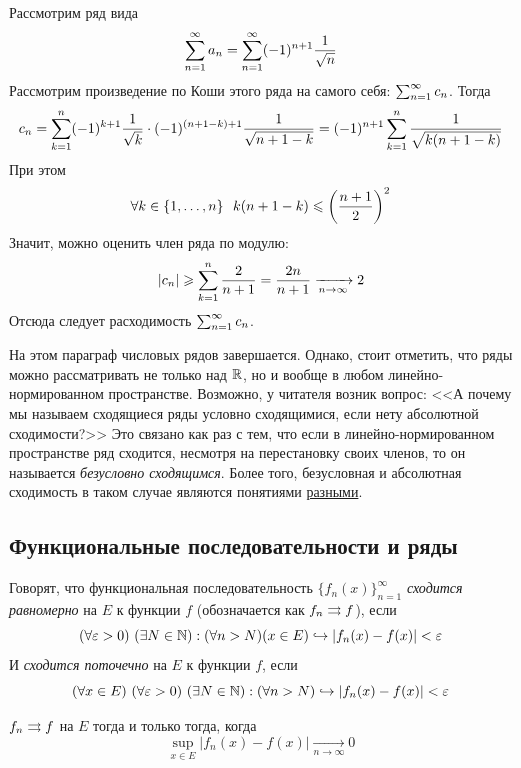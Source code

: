 \begin{example}
	Рассмотрим ряд вида
	\[
		\sum_{n = 1}^\infty a_n = \sum_{n = 1}^\infty (-1)^{n + 1} \frac{1}{\sqrt{n}}
	\]
	Рассмотрим произведение по Коши этого ряда на самого себя: $\sum_{n = 1}^\infty c_n$. Тогда
	\[
		c_n = \sum\limits_{k = 1}^n (-1)^{k + 1} \frac{1}{\sqrt{k}} \cdot (-1)^{(n + 1 - k) + 1} \frac{1}{\sqrt{n + 1 - k}} = (-1)^{n + 1} \sum\limits_{k = 1}^n \frac{1}{\sqrt{k(n + 1 - k)}}
	\]
	При этом
	\[
		\forall k \in \{1, \ldots, n\}\ \ k(n + 1 - k) \leqslant \left(\frac{n + 1}{2}\right)^2
	\]
	Значит, можно оценить член ряда по модулю:
	\[
		|c_n| \geqslant \sum\limits_{k = 1}^n \frac{2}{n + 1} = \frac{2n}{n + 1} \xrightarrow[n \to \infty]{} 2
	\]
	Отсюда следует расходимость $\sum_{n = 1}^\infty c_n$.
\end{example}

\begin{note}
	На этом параграф числовых рядов завершается. Однако, стоит отметить, что ряды можно рассматривать не только над $\mathbb{R}$, но и вообще в любом линейно-нормированном пространстве. Возможно, у читателя возник вопрос: <<А почему мы называем сходящиеся ряды условно сходящимися, если нету абсолютной сходимости?>> Это связано как раз с тем, что если в линейно-нормированном пространстве ряд сходится, несмотря на перестановку своих членов, то он называется \textit{безусловно сходящимся}. Более того, безусловная и абсолютная сходимость в таком случае являются понятиями \underline{разными}.
\end{note}

\subsection{Функциональные последовательности и ряды}

\begin{definition}
	Говорят, что функциональная последовательность $\{f_n(x)\}_{n = 1}^\infty$ \textit{сходится равномерно} на $E$ к функции $f$ (обозначается как $f_n \rightrightarrows f$), если
	\[
		(\forall \varepsilon > 0)\ (\exists N \in \mathbb{N}) : (\forall n > N) (x \in E) \hookrightarrow |f_n(x) - f(x)| < \varepsilon
	\]
	И \textit{сходится поточечно} на $E$ к функции $f$, если
	\[
		(\forall x \in E)\ (\forall \varepsilon > 0)\ (\exists N \in \mathbb{N}) : (\forall n > N) \hookrightarrow |f_n(x) - f(x)| < \varepsilon
	\]
\end{definition}

\begin{proposition}
	$f_n \rightrightarrows f$ на $E$ тогда и только тогда, когда
	\[
		\sup\limits_{x \in E} |f_n(x) - f(x)| \xrightarrow[n \to \infty]{} 0
	\]
\end{proposition}

